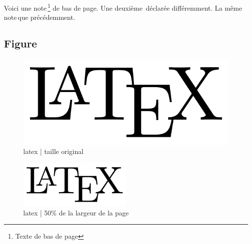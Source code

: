 Voici une note\,\footnote{Texte de bas de page} de bas de page.
Une deuxième\,\footnotemark{} déclarée différemment.
La même note\,\footnotemark[\value{footnote}] que précédemment.



%
\subsection{Figure}

\begin{figure}[!ht]
    \center
    \includegraphics[]{./images/LaTeX_logo.png}
    \caption{latex | taille original}
    \label{latex}
\end{figure}

\begin{figure}[!ht]
    \center
    \includegraphics[width=0.5\textwidth]{./images/LaTeX_logo.png}
    \caption{latex | 50\% de la largeur de la page}
\end{figure}




